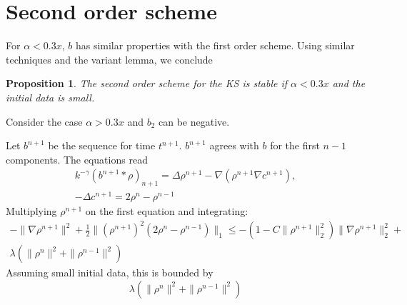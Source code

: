 \documentclass[11pt]{article}
\newtheorem{pro}{Proposition}
\begin{document}
\section{Second order scheme}

For $\alpha<0.3x$, $b$ has similar properties with the first order scheme. Using similar techniques and the variant lemma, we conclude
\begin{pro}
The second order scheme for the KS is stable if $\alpha<0.3x$ and the initial data is small.
\end{pro}

Consider the case $\alpha>0.3x$ and $b_2$ can be negative.

Let $b^{n+1}$ be the sequence for time $t^{n+1}$. $b^{n+1}$ agrees with $b$ for the first $n-1$ components. The equations read
\begin{gather*}
k^{-\gamma}(b^{n+1}*\rho)_{n+1}=\Delta\rho^{n+1}-\nabla(\rho^{n+1}\nabla c^{n+1}),\\
-\Delta c^{n+1}=2\rho^n-\rho^{n-1}
\end{gather*}
Multiplying $\rho^{n+1}$ on the first equation and integrating:
\begin{multline*}
-\|\nabla\rho^{n+1}\|^2+\frac{1}{2}\|(\rho^{n+1})^2(2\rho^n-\rho^{n-1})\|_1
\le -(1-C\|\rho^{n+1}\|_2^2)\|\nabla\rho^{n+1}\|_2^2+\\
\lambda(\|\rho^n\|^2+\|\rho^{n-1}\|^2)
\end{multline*}
Assuming small initial data, this is bounded by $$
\lambda(\|\rho^n\|^2+\|\rho^{n-1}\|^2)
$$
\end{document}
